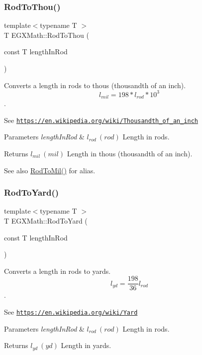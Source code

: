 \subsubsection{\texorpdfstring{Rod\+To\+Thou()}{RodToThou()}}
{\footnotesize\ttfamily template$<$typename T $>$ \\
T E\+G\+X\+Math\+::\+Rod\+To\+Thou (\begin{DoxyParamCaption}\item[{const T}]{length\+In\+Rod }\end{DoxyParamCaption})}



Converts a length in rods to thous (thousandth of an inch). \[ l_{mil}= 198 * l_{rod} * 10^{3} \]. 

See \href{https://en.wikipedia.org/wiki/Thousandth_of_an_inch}{\tt https\+://en.\+wikipedia.\+org/wiki/\+Thousandth\+\_\+of\+\_\+an\+\_\+inch} 
\begin{DoxyParams}{Parameters}
{\em length\+In\+Rod} & $ l_{rod}\ (rod)$ Length in rods. \\
\hline
\end{DoxyParams}
\begin{DoxyReturn}{Returns}
$ l_{mil}\ (mil)$ Length in thous (thousandth of an inch). 
\end{DoxyReturn}
\begin{DoxySeeAlso}{See also}
\mbox{\hyperlink{group___e_g_x_math-_conversions-_length_conversions-_surveyors-_rod-_imperial_ga8458f45f5b02b4127d0d5626422b17c3}{Rod\+To\+Mil()}} for alias. 
\end{DoxySeeAlso}
\mbox{\label{group___e_g_x_math-_conversions-_length_conversions-_surveyors-_rod-_imperial_gaf9c279c2819bf2c950dcde7a67849bf6}} 
\subsubsection{\texorpdfstring{Rod\+To\+Yard()}{RodToYard()}}
{\footnotesize\ttfamily template$<$typename T $>$ \\
T E\+G\+X\+Math\+::\+Rod\+To\+Yard (\begin{DoxyParamCaption}\item[{const T}]{length\+In\+Rod }\end{DoxyParamCaption})}



Converts a length in rods to yards. \[ l_{yd}= \frac{198}{36} l_{rod} \]. 

See \href{https://en.wikipedia.org/wiki/Yard}{\tt https\+://en.\+wikipedia.\+org/wiki/\+Yard} 
\begin{DoxyParams}{Parameters}
{\em length\+In\+Rod} & $ l_{rod}\ (rod)$ Length in rods. \\
\hline
\end{DoxyParams}
\begin{DoxyReturn}{Returns}
$ l_{yd}\ (yd)$ Length in yards. 
\end{DoxyReturn}
